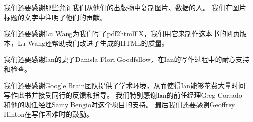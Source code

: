 我们还要感谢那些允许我们从他们的出版物中复制图片、数据的人。
我们在图片标题的文字中注明了他们的贡献。

我们还要感谢Lu Wang为我们写了pdf2htmlEX，我们用它来制作这本书的网页版本，Lu Wang还帮助我们改进了生成的HTML的质量。


我们还要感谢Ian的妻子Daniela Flori Goodfellow，在Ian的写作过程中的耐心支持和检查。


我们还要感谢Google Brain团队提供了学术环境，从而使得Ian能够花费大量时间写作此书并接受同行的反馈和指导。
我们特别感谢Ian的前任经理Greg Corrado 和他的现任经理Samy Bengio对这个项目的支持。
最后我们还要感谢Geoffrey Hinton在写作困难时的鼓励。


